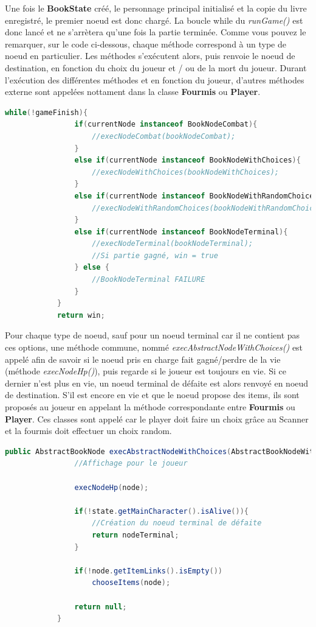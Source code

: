 		Une fois le \textbf{BookState} créé, le personnage principal initialisé et la copie du livre enregistré, le premier noeud est donc chargé. La boucle while du \textit{runGame()} est donc lancé et ne s'arrètera qu'une fois la partie terminée. Comme vous pouvez le remarquer, sur le code ci-dessous, chaque méthode correspond à un type de noeud en particulier. Les méthodes s'exécutent alors, puis renvoie le noeud de destination, en fonction du choix du joueur et / ou de la mort du joueur. Durant l'exécution des différentes méthodes et en fonction du joueur, d'autres méthodes externe sont appelées nottament dans la classe \textbf{Fourmis} ou \textbf{Player}.

		\begin{lstlisting}[gobble=12, language=java, label=lst:runGame, caption=Méthode runGame()]
			while(!gameFinish){
				if(currentNode instanceof BookNodeCombat){
					//execNodeCombat(bookNodeCombat);
				}
				else if(currentNode instanceof BookNodeWithChoices){
					//execNodeWithChoices(bookNodeWithChoices);
				}
				else if(currentNode instanceof BookNodeWithRandomChoices){
					//execNodeWithRandomChoices(bookNodeWithRandomChoices);
				}
				else if(currentNode instanceof BookNodeTerminal){
					//execNodeTerminal(bookNodeTerminal);
					//Si partie gagné, win = true
				} else {
					//BookNodeTerminal FAILURE
				}
			}
			return win;
		\end{lstlisting}

		Pour chaque type de noeud, sauf pour un noeud terminal car il ne contient pas ces options, une méthode commune, nommé \textit{execAbstractNodeWithChoices()} est appelé afin de savoir si le noeud pris en charge fait gagné/perdre de la vie (méthode \textit{execNodeHp()}), puis regarde si le joueur est toujours en vie. Si ce dernier n'est plus en vie, un noeud terminal de défaite est alors renvoyé en noeud de destination. S'il est encore en vie et que le noeud propose des items, ils sont proposés au joueur en appelant la méthode correspondante entre \textbf{Fourmis} ou \textbf{Player}. Ces classes sont appelé car le player doit faire un choix grâce au Scanner et la fourmis doit effectuer un choix random.\\

		\begin{lstlisting}[gobble=12, language=java, caption=Méthode execAbstractNodeWithChoices(), label=lst:execAbstractNodeWithChoices]
			public AbstractBookNode execAbstractNodeWithChoices(AbstractBookNodeWithChoices node){
				//Affichage pour le joueur

				execNodeHp(node);

				if(!state.getMainCharacter().isAlive()){
					//Création du noeud terminal de défaite
					return nodeTerminal;
				}

				if(!node.getItemLinks().isEmpty())
					chooseItems(node);

				return null;
			}
		\end{lstlisting}

